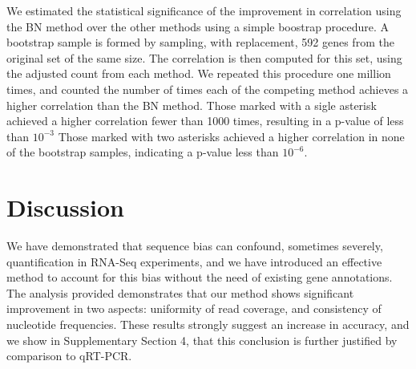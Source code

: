 \documentclass{bioinfo}
\begin{document}


\begin{table}

{
We estimated the statistical significance of the improvement in correlation
using the BN method over the other methods using a simple boostrap procedure. A
bootstrap sample is formed by sampling, with replacement, 592 genes from the
original set of the same size. The correlation is then computed for this set,
using the adjusted count from each method. We repeated this procedure one
million times, and counted the number of times each of the competing method achieves a
higher correlation than the BN method.  Those marked with a sigle asterisk
achieved a higher correlation fewer than 1000 times, resulting in a p-value of
less than $10^{-3}$ Those marked with two asterisks achieved a higher
correlation in none of the bootstrap samples, indicating a p-value less than
$10^{-6}$.
}
\end{table}



\section{Discussion}

We have demonstrated that sequence bias can confound, sometimes severely,
quantification in RNA-Seq experiments, and we have introduced an effective
method to account for this bias without the need of existing gene annotations.
The analysis provided demonstrates that our method shows significant improvement
in two aspects: uniformity of read coverage, and consistency of nucleotide
frequencies. These results strongly suggest an increase in accuracy, and we show
in Supplementary Section 4, that this conclusion is further justified by
comparison to qRT-PCR.
\end{document}
